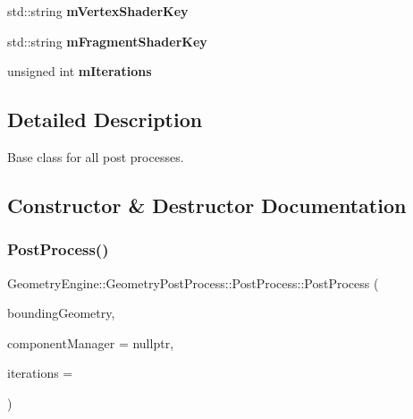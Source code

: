 \begin{DoxyCompactItemize}
std\+::string {\bfseries m\+Vertex\+Shader\+Key}
\item 
\mbox{\label{class_geometry_engine_1_1_geometry_post_process_1_1_post_process_a9fa0ab7cc584c09e5421bf3a79a26789}} 
std\+::string {\bfseries m\+Fragment\+Shader\+Key}
\item 
\mbox{\label{class_geometry_engine_1_1_geometry_post_process_1_1_post_process_a5604e174ac3662a712197ae1db5c38de}} 
unsigned int {\bfseries m\+Iterations}
\end{DoxyCompactItemize}


\subsection{Detailed Description}
Base class for all post processes. 

\subsection{Constructor \& Destructor Documentation}
\mbox{\label{class_geometry_engine_1_1_geometry_post_process_1_1_post_process_a8ac111eed6abc9c97e32fa609f0b2cc4}} 
\subsubsection{\texorpdfstring{PostProcess()}{PostProcess()}\hspace{0.1cm}{\footnotesize\ttfamily [1/2]}}
{\footnotesize\ttfamily Geometry\+Engine\+::\+Geometry\+Post\+Process\+::\+Post\+Process\+::\+Post\+Process (\begin{DoxyParamCaption}\item[{const \mbox{\hyperlink{class_geometry_engine_1_1_geometry_world_item_1_1_geometry_item_1_1_geometry_item}{Geometry\+World\+Item\+::\+Geometry\+Item\+::\+Geometry\+Item}} \&}]{bounding\+Geometry,  }\item[{const \mbox{\hyperlink{class_geometry_engine_1_1_custom_shading_1_1_custom_post_process_step_interface}{Custom\+Shading\+::\+Custom\+Post\+Process\+Step\+Interface}} $\ast$const}]{component\+Manager = {\ttfamily nullptr},  }\item[{unsigned int}]{iterations = {} }\end{DoxyParamCaption})}

